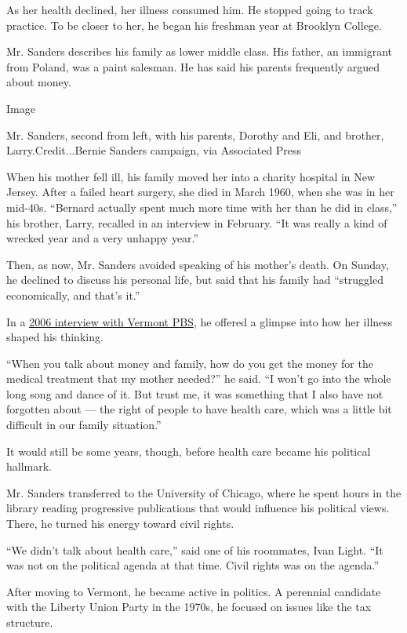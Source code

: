 As her health declined, her illness consumed him. He stopped going to
track practice. To be closer to her, he began his freshman year at
Brooklyn College.

Mr. Sanders describes his family as lower middle class. His father, an
immigrant from Poland, was a paint salesman. He has said his parents
frequently argued about money.

Image

Mr. Sanders, second from left, with his parents, Dorothy and Eli, and
brother, Larry.Credit...Bernie Sanders campaign, via Associated Press

When his mother fell ill, his family moved her into a charity hospital
in New Jersey. After a failed heart surgery, she died in March 1960,
when she was in her mid-40s. ``Bernard actually spent much more time
with her than he did in class,'' his brother, Larry, recalled in an
interview in February. ``It was really a kind of wrecked year and a very
unhappy year.''

Then, as now, Mr. Sanders avoided speaking of his mother's death. On
Sunday, he declined to discuss his personal life, but said that his
family had ``struggled economically, and that's it.''

In a
\href{https://video.vermontpbs.org/video/political-profiles-bernie-sanders-om6tgp/}{2006
interview with Vermont PBS}, he offered a glimpse into how her illness
shaped his thinking.

``When you talk about money and family, how do you get the money for the
medical treatment that my mother needed?'' he said. ``I won't go into
the whole long song and dance of it. But trust me, it was something that
I also have not forgotten about --- the right of people to have health
care, which was a little bit difficult in our family situation.''

It would still be some years, though, before health care became his
political hallmark.

Mr. Sanders transferred to the University of Chicago, where he spent
hours in the library reading progressive publications that would
influence his political views. There, he turned his energy toward civil
rights.

``We didn't talk about health care,'' said one of his roommates, Ivan
Light. ``It was not on the political agenda at that time. Civil rights
was on the agenda.''

After moving to Vermont, he became active in politics. A perennial
candidate with the Liberty Union Party in the 1970s, he focused on
issues like the tax structure.

